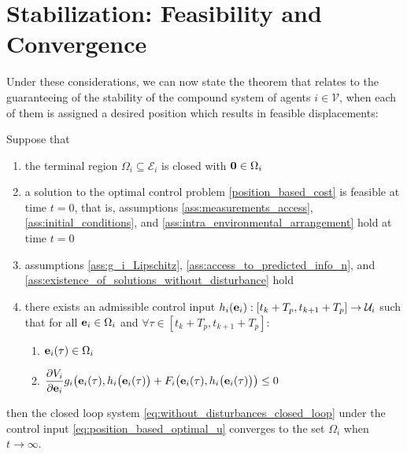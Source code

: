 \section{Stabilization: Feasibility and Convergence}

Under these considerations, we can now state the theorem that relates to
the guaranteeing of the stability of the compound system of agents
$i \in \mathcal{V}$, when each of them is assigned a desired
position which results in feasible displacements:\\[2.5ex]

\begin{bw_box}
\begin{theorem}

  Suppose that

  \begin{enumerate}
    \item the terminal region $\Omega_i \subseteq \mathcal{E}_i$ is
      closed with $\bm{\mathbf{0}} \in \Omega_i$
    \item a solution to the optimal control problem \eqref{position_based_cost}
      is feasible at time $t=0$, that is, assumptions
      \eqref{ass:measurements_access}, \eqref{ass:initial_conditions}, and
      \eqref{ass:intra_environmental_arrangement} hold at time $t=0$
    \item assumptions \eqref{ass:g_i_Lipschitz}, \eqref{ass:access_to_predicted_info_n},
      and \eqref{ass:existence_of_solutions_without_disturbance} hold
    \item there exists an admissible control input
      $h_i(\bm{\mathbf{e}}_i) : [t_k + T_p, t_{k+1} + T_p] \to \mathcal{U}_i$
      such that for all $\bm{\mathbf{e}}_i \in \Omega_i$ and
      $\forall \tau \in [t_k + T_p, t_{k+1} + T_p]$:

      \begin{enumerate}
        \item $\bm{\mathbf{e}}_i(\tau) \in \Omega_i$
        \item $\dfrac{\partial V_i}{\partial \bm{\mathbf{e}}_i} g_i\big(\bm{\mathbf{e}}_i(\tau),
        h_i\big(\bm{\mathbf{e}}_i(\tau)\big)
          + F_i\big(\bm{\mathbf{e}}_i(\tau), h_i\big(\bm{\mathbf{e}}_i(\tau)\big)\big) \leq 0$
      \end{enumerate}

  \end{enumerate}

  then the closed loop system \eqref{eq:without_disturbances_closed_loop} under
  the control input \eqref{eq:position_based_optimal_u} converges to the set
  $\Omega_i$ when $t \to \infty$.

\end{theorem}
\end{bw_box}

